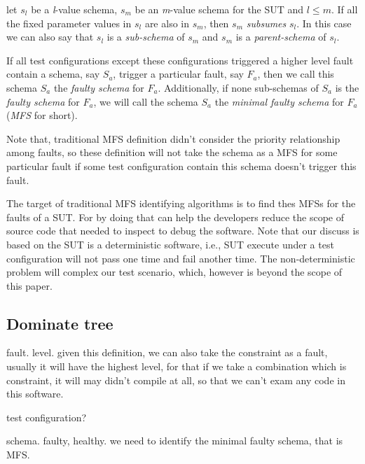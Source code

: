 \documentclass{sig-alternate}
\begin{document}
\begin{definition}
let $s_{l}$ be a \emph{l}-value schema, $s_{m}$ be an \emph{m}-value schema for the SUT and $l \leq m$. If all the fixed parameter values in $s_{l}$ are also in $s_{m}$, then $s_{m}$ \emph{subsumes} $s_{l}$. In this case we can also say that $s_{l}$ is a \emph{sub-schema} of $s_{m}$ and $s_{m}$ is a \emph{parent-schema} of $s_{l}$.
\end{definition}

\begin{definition}
If all test configurations except these configurations triggered a higher level fault contain a schema, say $S_{a}$, trigger a particular fault, say $F_{a}$, then we call this schema $S_{a}$ the \emph{faulty schema} for $F_{a}$. Additionally, if none sub-schemas of $S_{a}$ is the \emph{faulty schema} for $F_{a}$, we will call the schema $S_{a}$ the \emph{minimal faulty schema} for $F_{a}$(\emph{MFS} for short).

Note that, traditional MFS definition didn't consider the priority relationship among faults, so these definition will not take the schema as a MFS for some particular fault if some test configuration contain this schema doesn't trigger this fault.
\end{definition}

The target of traditional MFS identifying algorithms is to find thes MFSs for the faults of a SUT. For by doing that can help the developers reduce the scope of source code that needed to inspect to debug the software. Note that our discuss is based on the SUT is a deterministic software, i.e., SUT execute under a test configuration will not pass one time and fail another time. The non-deterministic problem will complex our test scenario, which, however is beyond the scope of this paper.

\subsection{Dominate tree}

fault. level.
given this definition, we can also take the constraint as a fault, usually it will have the highest level, for that if we take a combination which is constraint, it will may didn't compile at all, so that we can't exam any code in this software.

test configuration?

schema.
faulty, healthy.
we need to identify the minimal faulty schema, that is MFS.
\end{document}
